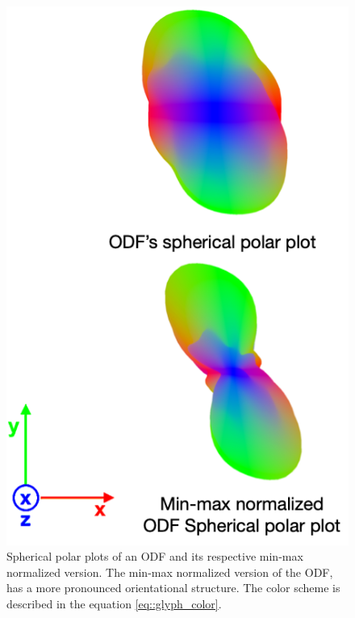 \documentclass[twoside,twocolumn,10pt]{article}
\begin{document}
\begin{figure}[htb]
    \centering
    \includegraphics[width=.45\linewidth, angle=0]{figs/SphericalMeshModulation.png}
    \caption{Spherical polar plots of an ODF and its respective min-max normalized version. The min-max normalized version of the ODF, has a more pronounced orientational structure. The color scheme is described in the equation \ref{eq::glyph_color}.}
    \label{fig::intro_glyph}
\end{figure}


\end{document}
